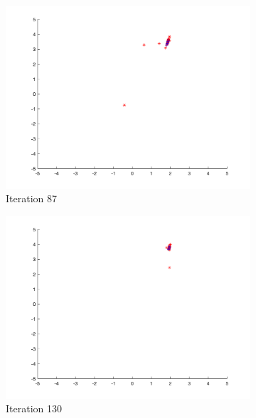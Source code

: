 \begin{figure}
\begin{subfigure}[b]{0.4\textwidth}
    \includegraphics[width=\textwidth]{img/smpl/rosn2d-2-100/loa-iter-87}
    \caption{Iteration 87}
    \label{fig:s5-iter-2}
  \end{subfigure}
  \begin{subfigure}[b]{0.4\textwidth}
    \includegraphics[width=\textwidth]{img/smpl/rosn2d-2-100/loa-iter-130}
    \caption{Iteration 130}
    \label{fig:s5-iter-3}
  \end{subfigure}
  \begin{subfigure}[b]{0.4\textwidth}

\end{subfigure}
\end{figure}

